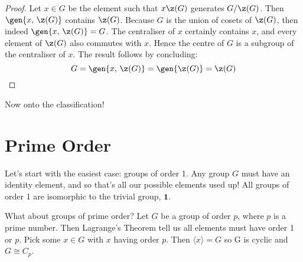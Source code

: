 \begin{proof}
    Let \(x \in G\) be the element such that \(x\z(G)\) generates \(G/\z(G)\).
    Then \(\gen{x,\,\z(G)}\) contains \(\z(G)\).
    Because \(G\) is the union of cosets of \(\z(G)\), then indeed \(\gen{x,\,\z(G)} = G\).
    The centraliser of \(x\) certainly contains \(x\), and every element of \(\z(G)\) also commutes with \(x\).
    Hence the centre of \(G\) is a subgroup of the centraliser of \(x\).
    The result follows by concluding:
    \[G = \gen{x,\,\z(G)} = \gen{\z(G)} = \z(G)\]
\end{proof}

Now onto the classification!

\section{Prime Order}
Let's start with the easiest case: groups of order 1.
Any group \(G\) must have an identity element, and so that's all our possible elements used up!
All groups of order 1 are isomorphic to the trivial group, \(\bm{1}\).

What about groups of prime order?
Let \(G\) be a group of order \(p\), where \(p\) is a prime number.
Then Lagrange's Theorem tell us all elements must have order 1 or \(p\).
Pick some \(x \in G\) with \(x\) having order \(p\).
Then \(\langle x \rangle = G\) so G is cyclic and \(G \cong C_p\).
